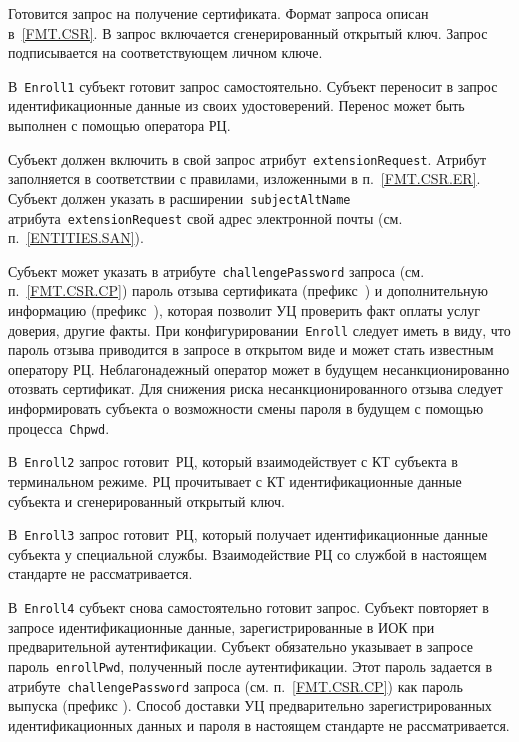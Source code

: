Готовится запрос на получение сертификата. Формат запроса описан
в~\ref{FMT.CSR}. В запрос включается сгенерированный открытый ключ. 
Запрос подписывается на соответствующем личном ключе.

В~\texttt{Enroll1} субъект готовит запрос самостоятельно.
Субъект переносит в запрос идентификационные данные из своих 
удостоверений. Перенос может быть выполнен с помощью оператора РЦ.

Субъект должен включить в свой запрос атрибут~\texttt{extensionRequest}.
Атрибут заполняется в соответствии с правилами, изложенными в 
п.~\ref{FMT.CSR.ER}. Субъект должен указать в 
расширении~\texttt{subjectAltName} атрибута~\texttt{extensionRequest} 
свой адрес электронной почты (см. п.~\ref{ENTITIES.SAN}).

Субъект может указать в атрибуте~\texttt{challengePassword} запроса 
(см. п.~\ref{FMT.CSR.CP}) пароль отзыва сертификата (префикс~)
и дополнительную информацию (префикс~), которая позволит УЦ 
проверить факт оплаты услуг доверия, другие факты.
%
При конфигурировании~\texttt{Enroll} следует иметь в виду, что пароль 
отзыва приводится в запросе в открытом виде и может стать известным 
оператору РЦ. Неблагонадежный оператор может в будущем несанкционированно 
отозвать сертификат. Для снижения риска несанкционированного отзыва 
следует информировать субъекта о возможности смены пароля в будущем с помощью 
процесса~\texttt{Chpwd}.

В~\texttt{Enroll2} запрос готовит~РЦ, который взаимодействует с КТ 
субъекта в терминальном режиме. РЦ прочитывает с КТ идентификационные 
данные субъекта и сгенерированный открытый ключ.

В~\texttt{Enroll3} запрос готовит~РЦ, который получает идентификационные 
данные субъекта у специальной службы. Взаимодействие РЦ со службой в 
настоящем стандарте не рассматривается.


В~\texttt{Enroll4} субъект снова самостоятельно готовит запрос.
Субъект повторяет в запросе идентификационные данные, 
зарегистрированные в ИОК при предварительной аутентификации. 
%
Субъект обязательно указывает в запросе пароль~\texttt{enrollPwd}, 
полученный после аутентификации. Этот пароль задается в 
атрибуте~\texttt{challengePassword} запроса 
(см. п.~\ref{FMT.CSR.CP}) как пароль выпуска (префикс ).
%
Способ доставки УЦ предварительно зарегистрированных 
идентификационных данных и пароля в настоящем стандарте 
не рассматривается.

